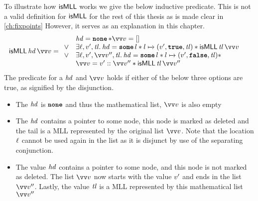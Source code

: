 \documentclass[thesis.tex]{subfiles}
\begin{document}
To illustrate how $\textsf{\upshape isMLL}$ works we give the below inductive predicate. This is not a valid definition for $\textsf{\upshape isMLL}$ for the rest of this thesis as is made clear in \cref*{ch:fixpoints} However, it serves as an explanation in this chapter.
\begin{align*}
  \isMLL\, \langv{hd}\, \vect{\val} & =
  \begin{array}{cl}
           & \langv{hd} = \None * \vect{\val} = []                                                                                             \\
      \lor & \Exists \loc, \val', \langv{tl}. \langv{hd} = \Some l * l \fmapsto (\val', \True, \langv{tl}) * \isMLL\, \langv{tl}\, \vect{\val} \\
      \lor & \Exists \loc, \val', \vect{\val}'', \langv{tl}. \langv{hd} = \Some l * l \fmapsto (\val', \False, \langv{tl}) *                   \\
           & \vect{\val} = \val' :: \vect{\val}'' * \isMLL\, \langv{tl}\, \vect{\val}''
  \end{array}
\end{align*}
The predicate \isMLL for a $\mathit{hd}$ and $\vect{\val}$ holds if either of the below three options are true, as signified by the disjunction.
\begin{itemize}
  \item The $\mathit{hd}$ is $\operatorname{\texttt{\bfseries none}}$ and thus the mathematical list, $\vect{\val}$ is also empty
  \item The $\mathit{hd}$ contains a pointer to some node, this node is marked as deleted and the tail is a MLL represented by the original list $\vect{\val}$. Note that the location $\ell$ cannot be used again in the list as it is disjunct by use of the separating conjunction.
  \item The value $\mathit{hd}$ contains a pointer to some node, and this node is not marked as deleted. The list $\vect{\val}$ now starts with the value $v'$ and ends in the list $\vect{\val}''$. Lastly, the value $\mathit{tl}$ is a MLL represented by this mathematical list $\vect{\val}''$
\end{itemize}
\end{document}
